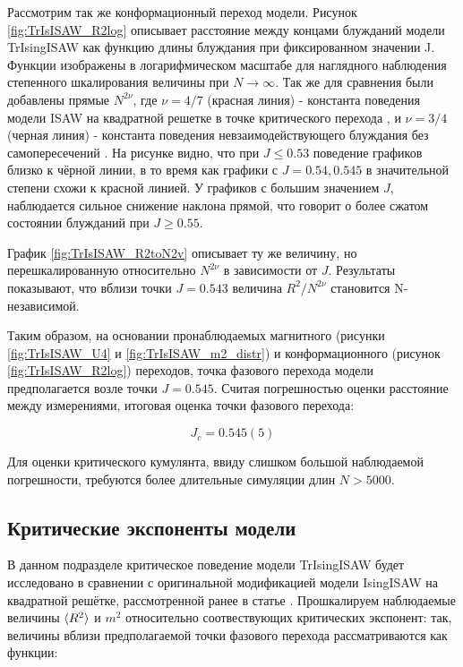 Рассмотрим так же конформационный переход модели.
Рисунок \ref{fig:TrIsISAW_R2log} описывает расстояние между концами блужданий модели TrIsingISAW как функцию длины блуждания при фиксированном значении J.
Функции изображены в логарифмическом масштабе для наглядного наблюдения степенного шкалирования величины при $N \to \infty$.
Так же для сравнения были добавлены прямые $N^{2\nu}$, где $\nu = 4/7$ (красная линия) - константа поведения модели ISAW на квадратной решетке в точке критического перехода \cite{Duplantier1987},
и $\nu = 3/4$ (черная линия) - константа поведения невзаимодействующего блуждания без самопересечений \cite{Rensburg2015}.
На рисунке видно, что при $J \leq 0.53$ поведение графиков близко к чёрной линии, в то время как графики с $J = 0.54, 0.545$ в значительной степени схожи к красной линией.
У графиков с большим значением $J$, наблюдается сильное снижение наклона прямой, что говорит о более сжатом состоянии блужданий при $J \geq 0.55$.  

График \ref{fig:TrIsISAW_R2toN2v} описывает ту же величину, но перешкалированную относительно $N^{2\nu}$ в зависимости от $J$.
Результаты показывают, что вблизи точки $J = 0.543$ величина $R^2 / N^{2\nu}$ становится N-независимой. 

Таким образом, на основании пронаблюдаемых магнитного (рисунки \ref{fig:TrIsISAW_U4} и \ref{fig:TrIsISAW_m2_distr}) и конформационного (рисунок \ref{fig:TrIsISAW_R2log}) переходов,
точка фазового перехода модели предполагается возле точки $J=0.545$. Считая погрешностью оценки расстояние между измерениями, итоговая оценка точки фазового перехода:

\begin{equation}
\label{eq:TrIsISAW_Jc}
	J_c = 0.545(5)
\end{equation}

Для оценки критического кумулянта, ввиду слишком большой наблюдаемой погрешности, требуются более длительные симуляции длин $N > 5000$.


\newpage

\subsection{Критические экспоненты модели}

В данном подразделе критическое поведение модели TrIsingISAW будет исследовано в сравнении с оригинальной модификацией модели IsingISAW на квадратной решётке, рассмотренной ранее в статье \cite{faizullina2021critical}.
Прошкалируем наблюдаемые величины $\langle R^2 \rangle$ и $m^2$ относительно соотвествующих критических экспонент:
так, величины вблизи предполагаемой точки фазового перехода рассматриваются как функции:

